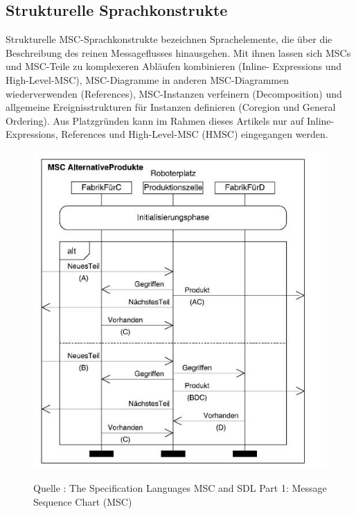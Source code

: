 \subsection{Strukturelle Sprachkonstrukte}
Strukturelle MSC-Sprachkonstrukte bezeichnen Sprachelemente,
die über die Beschreibung des reinen Messageflusses
hinausgehen. Mit ihnen lassen sich MSCs und
MSC-Teile zu komplexeren Abläufen kombinieren (Inline-
Expressions und High-Level-MSC), MSC-Diagramme in
anderen MSC-Diagrammen wiederverwenden (References),
MSC-Instanzen verfeinern (Decomposition) und allgemeine
Ereignisstrukturen für Instanzen definieren (Coregion und
General Ordering). Aus Platzgründen kann im Rahmen
dieses Artikels nur auf Inline-Expressions, References und
High-Level-MSC (HMSC) eingegangen werden.\\

\begin{center}
\begin{figure}[h]
   

\includegraphics[scale=1]{Graphics/MSCmit.jpg}



Quelle : The Specification Languages MSC and SDL
Part 1: Message Sequence Chart (MSC) 

 
\label{fig8}


\end{figure}

\end{center}
\newpage
